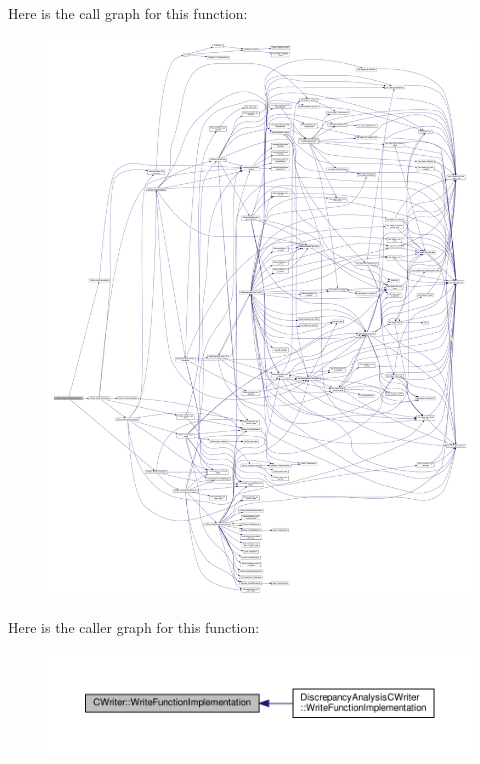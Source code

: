 Here is the call graph for this function\+:
\nopagebreak
\begin{figure}[H]
\begin{center}
\leavevmode
\includegraphics[width=350pt]{d3/d59/classCWriter_a3a050cfd9987eb7a7227865cf40db91d_cgraph}
\end{center}
\end{figure}
Here is the caller graph for this function\+:
\nopagebreak
\begin{figure}[H]
\begin{center}
\leavevmode
\includegraphics[width=350pt]{d3/d59/classCWriter_a3a050cfd9987eb7a7227865cf40db91d_icgraph}
\end{center}
\end{figure}
\mbox{\label{classCWriter_a42b2b558bd1efb2dc637664f5df4df28}} 
